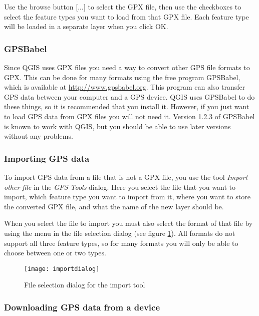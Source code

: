 Use the browse button {[}...{]} to select the GPX file, then use the
checkboxes to select the feature types you want to load from that
GPX file. Each feature type will be loaded in a separate layer when
you click OK.

\subsubsection{GPSBabel}

Since QGIS uses GPX files you need a way to convert other GPS file
formats to GPX. This can be done for many formats using the free program
GPSBabel, which is available at \url{http://www.gpsbabel.org}. This
program can also transfer GPS data between your computer and a GPS
device. QGIS uses GPSBabel to do these things, so it is recommended
that you install it. However, if you just want to load GPS data from
GPX files you will not need it. Version 1.2.3 of GPSBabel is known
to work with QGIS, but you should be able to use later versions without
any problems.


\subsubsection{Importing GPS data}

To import GPS data from a file that is not a GPX file, you use the
tool \emph{Import other file} in the \emph{GPS Tools} dialog. Here
you select the file that you want to import, which feature type you
want to import from it, where you want to store the converted GPX
file, and what the name of the new layer should be.

When you select the file to import you must also select the format
of that file by using the menu in the file selection dialog (see figure
\ref{figure importdialog}). All formats do not support all three
feature types, so for many formats you will only be able to choose
between one or two types.

\begin{figure}[ht]
   \begin{center}
\caption{\label{figure importdialog}File selection dialog for the import
tool}
\texttt{[image: importdialog]}
   \end{center}
\end{figure}

\subsubsection{Downloading GPS data from a device}

